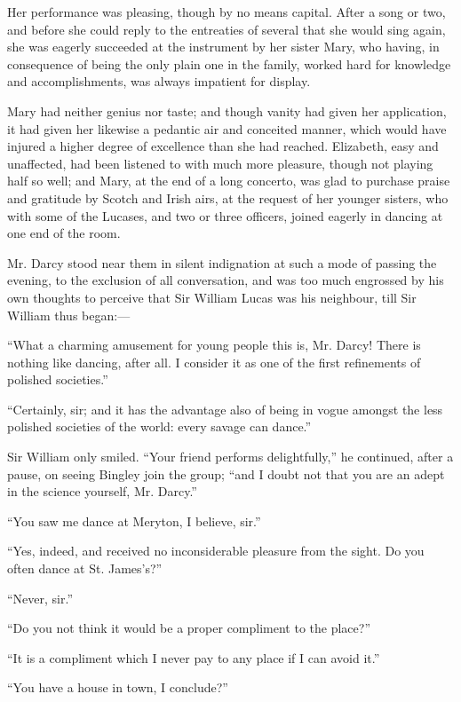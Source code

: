 \documentclass[10pt]{book}
\begin{document}
   Her performance was pleasing, though by no means capital. After a song
or two, and before she could reply to the entreaties of several that she
would sing again, she was eagerly succeeded at the instrument by her
sister Mary, who having, in consequence of being the only plain one in
the family, worked hard for knowledge and accomplishments, was always
impatient for display.
  

   Mary had neither genius nor taste; and though vanity had given her
application, it had given her likewise a pedantic air and conceited
manner, which would have injured a higher degree of excellence than she
had reached. Elizabeth, easy and unaffected, had been listened to with
much more pleasure, though not playing half so well; and Mary, at the
end of a long concerto, was glad to purchase praise and gratitude by
Scotch and Irish airs, at the request of her younger sisters, who with
some of the Lucases, and two or three officers, joined eagerly in
dancing at one end of the room.
  

   Mr. Darcy stood near them in silent indignation at such a mode of
passing the evening, to the exclusion of all conversation, and was too
much engrossed by his own thoughts to perceive that Sir William Lucas
was his neighbour, till Sir William thus began:—
  

   “What a charming amusement for young people this is, Mr. Darcy! There is
nothing like dancing, after all. I consider it as one of the first
refinements of polished societies.”
  

   “Certainly, sir; and it has the advantage also of being in vogue amongst
the less polished societies of the world: every savage can dance.”
  

   Sir William only smiled. “Your friend performs delightfully,” he
continued, after a pause, on seeing Bingley join the group; “and I doubt
not that you are an adept in the science yourself, Mr. Darcy.”
  

   “You saw me dance at Meryton, I believe, sir.”
  

   “Yes, indeed, and received no inconsiderable pleasure from the sight. Do
you often dance at St. James’s?”
  

   “Never, sir.”
  

   “Do you not think it would be a proper compliment to the place?”
  

   “It is a compliment which I never pay to any place if I can avoid it.”
  

   “You have a house in town, I conclude?”
  
\end{document}
